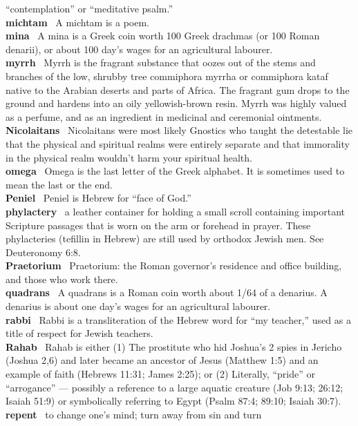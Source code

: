 ``contemplation'' or ``meditative psalm.''\\
\textbf{michtam}~ A michtam is a poem.\\
\textbf{mina}~ A mina is a Greek coin worth 100 Greek drachmas (or 100
Roman denarii), or about 100 day's wages for an agricultural labourer.\\
\textbf{myrrh}~ Myrrh is the fragrant substance that oozes out of the
stems and branches of the low, shrubby tree commiphora myrrha or
commiphora kataf native to the Arabian deserts and parts of Africa. The
fragrant gum drops to the ground and hardens into an oily
yellowish-brown resin. Myrrh was highly valued as a perfume, and as an
ingredient in medicinal and ceremonial ointments.\\
\textbf{Nicolaitans}~ Nicolaitans were most likely Gnostics who taught
the detestable lie that the physical and spiritual realms were entirely
separate and that immorality in the physical realm wouldn't harm your
spiritual health.\\
\textbf{omega}~ Omega is the last letter of the Greek alphabet. It is
sometimes used to mean the last or the end.\\
\textbf{Peniel}~ Peniel is Hebrew for ``face of God.''\\
\textbf{phylactery}~ a leather container for holding a small scroll
containing important Scripture passages that is worn on the arm or
forehead in prayer. These phylacteries (tefillin in Hebrew) are still
used by orthodox Jewish men. See Deuteronomy 6:8.\\
\textbf{Praetorium}~ Praetorium: the Roman governor's residence and
office building, and those who work there.\\
\textbf{quadrans}~ A quadrans is a Roman coin worth about 1/64 of a
denarius. A denarius is about one day's wages for an agricultural
labourer.\\
\textbf{rabbi}~ Rabbi is a transliteration of the Hebrew word for ``my
teacher,'' used as a title of respect for Jewish teachers.\\
\textbf{Rahab}~ Rahab is either (1) The prostitute who hid Joshua's 2
spies in Jericho (Joshua 2,6) and later became an ancestor of Jesus
(Matthew 1:5) and an example of faith (Hebrews 11:31; James 2:25); or
(2) Literally, ``pride'' or ``arrogance'' --- possibly a reference to a
large aquatic creature (Job 9:13; 26:12; Isaiah 51:9) or symbolically
referring to Egypt (Psalm 87:4; 89:10; Isaiah 30:7).\\
\textbf{repent}~ to change one's mind; turn away from sin and turn
